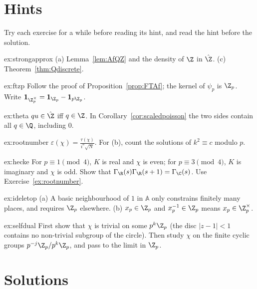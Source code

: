 \section{Hints}

Try each exercise for a while before reading its hint, and read the hint before the solution.

\begin{hint}{ex:strongapprox}
(a) Lemma~\ref{lem:AfQZ} and the density of $\Z$ in $\hat{\Z}$. (c) Theorem~\ref{thm:Qdiscrete}.
\end{hint}
\begin{hint}{ex:ftzp}
Follow the proof of Proposition~\ref{prop:FTAf}; the kernel of $\psi_p$ is $\Z_p$. Write $\mathbf 1_{\Z_p^\times}=\mathbf 1_{\Z_p}-\mathbf 1_{p\Z_p}$.
\end{hint}
\begin{hint}{ex:theta}
$qu\in\hat{\Z}$ iff $q\in\Z$. In Corollary~\ref{cor:scaledpoisson} the two sides contain all $q\in\Q$, including $0$.
\end{hint}
\begin{hint}{ex:rootnumber}
$\varepsilon(\chi)=\frac{\tau(\chi)}{i^a\sqrt N}$. For (b), count the solutions of $k^2\equiv c$ modulo $p$.
\end{hint}
\begin{hint}{ex:hecke}
For $p\equiv1\pmod4$, $K$ is real and $\chi$ is even; for $p\equiv3\pmod4$, $K$ is imaginary and $\chi$ is odd. Show that $\Gamma_\R(s)\Gamma_\R(s+1)=\Gamma_\C(s)$.
Use Exercise~\ref{ex:rootnumber}.
\end{hint}
\begin{hint}{ex:ideletop}
(a) A basic neighbourhood of $1$ in $\mathbb{A}$ only constrains finitely many places, and requires $\Z_p$ elsewhere. (b) $x_p\in\Z_p$ and $x_p^{-1}\in\Z_p$ means
$x_p\in\Z_p^\times$.
\end{hint}
\begin{hint}{ex:selfdual}
First show that $\chi$ is trivial on some $p^k\Z_p$ (the disc $|z-1|<1$ contains no non-trivial subgroup of the circle). Then study $\chi$ on the finite cyclic
groups $p^{-j}\Z_p/p^k\Z_p$, and pass to the limit in $\Z_p$.
\end{hint}

\section{Solutions}

